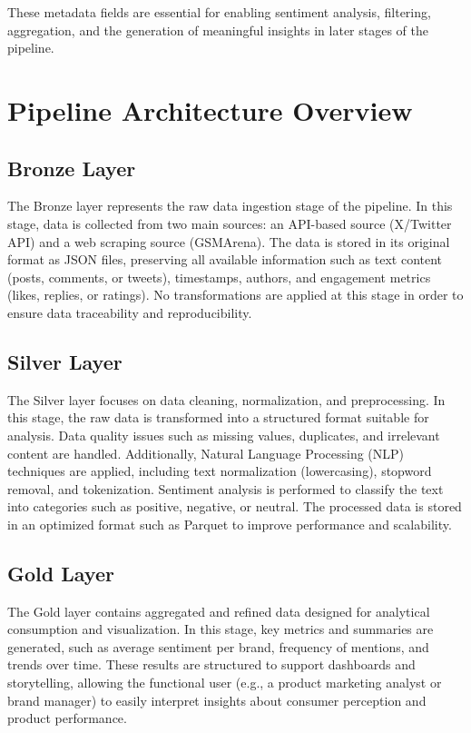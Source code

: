 \documentclass[12pt]{article}
\begin{document}
These metadata fields are essential for enabling sentiment analysis, filtering, aggregation, and the generation of meaningful insights in later stages of the pipeline.

\section{Pipeline Architecture Overview}

\subsection{Bronze Layer}
The Bronze layer represents the raw data ingestion stage of the pipeline. In this stage, data is collected from two main sources: an API-based source (X/Twitter API) and a web scraping source (GSMArena). The data is stored in its original format as JSON files, preserving all available information such as text content (posts, comments, or tweets), timestamps, authors, and engagement metrics (likes, replies, or ratings). No transformations are applied at this stage in order to ensure data traceability and reproducibility.

\subsection{Silver Layer}
The Silver layer focuses on data cleaning, normalization, and preprocessing. In this stage, the raw data is transformed into a structured format suitable for analysis. Data quality issues such as missing values, duplicates, and irrelevant content are handled. Additionally, Natural Language Processing (NLP) techniques are applied, including text normalization (lowercasing), stopword removal, and tokenization. Sentiment analysis is performed to classify the text into categories such as positive, negative, or neutral. The processed data is stored in an optimized format such as Parquet to improve performance and scalability.

\subsection{Gold Layer}
The Gold layer contains aggregated and refined data designed for analytical consumption and visualization. In this stage, key metrics and summaries are generated, such as average sentiment per brand, frequency of mentions, and trends over time. These results are structured to support dashboards and storytelling, allowing the functional user (e.g., a product marketing analyst or brand manager) to easily interpret insights about consumer perception and product performance.
\end{document}
